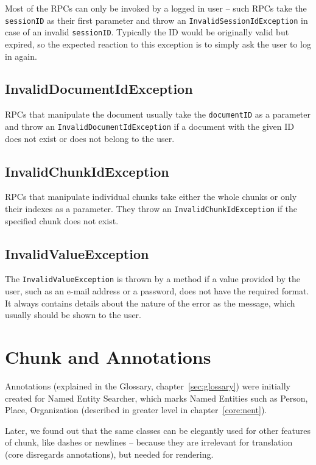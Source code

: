 Most of the RPCs can only be invoked by a logged in user -- such RPCs take the {\tt sessionID} as their first parameter and throw an {\tt InvalidSessionIdException} in case of an invalid {\tt sessionID}. Typically the ID would be originally valid but expired, so the expected reaction to this exception is to simply ask the user to log in again.

\subsection{InvalidDocumentIdException}

RPCs that manipulate the document usually take the {\tt documentID} as a parameter and throw an {\tt InvalidDocumentIdException} if a document with the given ID does not exist or does not belong to the user.

\subsection{InvalidChunkIdException}

RPCs that manipulate individual chunks take either the whole chunks or only their indexes as a parameter. They throw an {\tt InvalidChunkIdException} if the specified chunk does not exist.

\subsection{InvalidValueException}

The {\tt InvalidValueException} is thrown by a method if a value provided by the user, such as an e-mail address or a password, does not have the required format. It always contains details about the nature of the error as the message, which usually should be shown to the user.


\section{Chunk and Annotations}

Annotations (explained in the Glossary, chapter~\ref{sec:glossary}) were 
initially created for Named Entity Searcher, which marks Named Entities such as Person, Place, Organization (described in greater level in chapter~\ref{core:nent}).

Later, we found out that the same classes can be elegantly used for other features of chunk, like dashes or newlines -- because they are irrelevant for translation (core disregards annotations), but needed for rendering.


